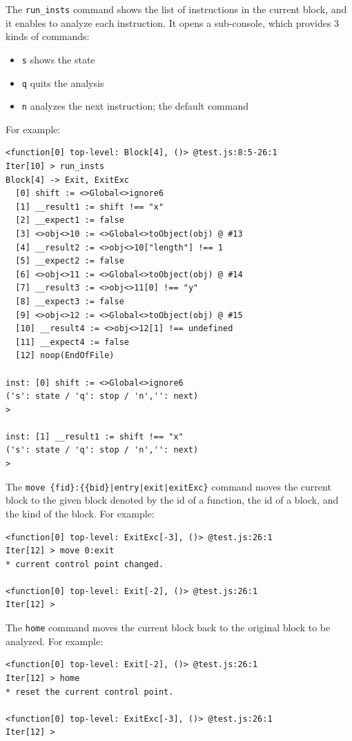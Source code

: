 \medskip
The \verb!run_insts! command shows the list of instructions in the current block,
and it enables to analyze each instruction.  It opens a sub-console, which provides 3 kinds
of commands:
\begin{itemize}
\itemsep-.1em
\item \verb!s! shows the state
\item \verb!q! quits the analysis
\item \verb!n! analyzes the next instruction; the default command
\end{itemize}
For example:
{\small
\begin{verbatim}
<function[0] top-level: Block[4], ()> @test.js:8:5-26:1
Iter[10] > run_insts 
Block[4] -> Exit, ExitExc
  [0] shift := <>Global<>ignore6
  [1] __result1 := shift !== "x"
  [2] __expect1 := false
  [3] <>obj<>10 := <>Global<>toObject(obj) @ #13
  [4] __result2 := <>obj<>10["length"] !== 1
  [5] __expect2 := false
  [6] <>obj<>11 := <>Global<>toObject(obj) @ #14
  [7] __result3 := <>obj<>11[0] !== "y"
  [8] __expect3 := false
  [9] <>obj<>12 := <>Global<>toObject(obj) @ #15
  [10] __result4 := <>obj<>12[1] !== undefined
  [11] __expect4 := false
  [12] noop(EndOfFile)

inst: [0] shift := <>Global<>ignore6
('s': state / 'q': stop / 'n','': next)
>

inst: [1] __result1 := shift !== "x"
('s': state / 'q': stop / 'n','': next)
> 
\end{verbatim}
}

\medskip
The \verb!move {fid}:{{bid}|entry|exit|exitExc}! command
moves the current block to the given block denoted by the id of a function,
the id of a block, and the kind of the block.  For example:
{\small
\begin{verbatim}
<function[0] top-level: ExitExc[-3], ()> @test.js:26:1
Iter[12] > move 0:exit
* current control point changed.

<function[0] top-level: Exit[-2], ()> @test.js:26:1
Iter[12] >
\end{verbatim}
}

\medskip
The \verb!home! command moves the current block back to the original
block to be analyzed.  For example:
{\small
\begin{verbatim}
<function[0] top-level: Exit[-2], ()> @test.js:26:1
Iter[12] > home
* reset the current control point.

<function[0] top-level: ExitExc[-3], ()> @test.js:26:1
Iter[12] >
\end{verbatim}
}

